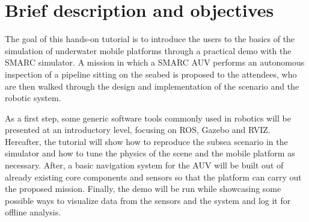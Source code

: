 \documentclass[
10pt, %
a4paper, %
oneside, %
BCOR5mm, %
]{scrartcl}
\begin{document}

\let\thefootnote\relax{}




 

\section{Brief description and objectives}
\label{sec:description}
The goal of this hands-on tutorial is to introduce the users to the basics of the simulation of underwater mobile platforms through a practical demo with the SMARC simulator.
A mission in which a SMARC AUV performs an autonomous inspection of a pipeline sitting on the seabed is proposed to the attendees, who are then walked through the design and implementation of the scenario and the robotic system.

As a first step, some generic software tools commonly used in robotics will be presented at an introductory level, focusing on ROS, Gazebo and RVIZ.
Hereafter, the tutorial will show how to reproduce the subsea scenario in the simulator and how to tune the physics of the scene and the mobile platform as necessary.
After, a basic navigation system for the AUV will be built out of already existing core components and sensors so that the platform can carry out the proposed mission.
Finally, the demo will be run while showcasing some possible ways to visualize data from the sensors and the system and log it for offline analysis.
\end{document}
